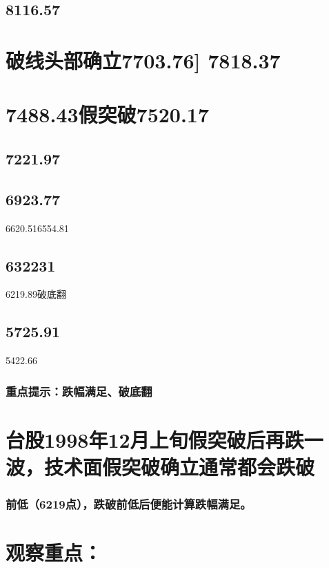 \documentclass{article}
\begin{document}
\subsection{8116.57}

\section{破线头部确立7703.76] 7818.37}

\section{7488.43假突破7520.17}

\subsection{7221.97}

\subsection{6923.77}

6620.516554.81

\subsection{632231}

6219.89破底翻

\subsection{5725.91}

5422.66

\subsubsection{重点提示：跌幅满足、破底翻}

\section{台股1998年12月上旬假突破后再跌一波，技术面假突破确立通常都会跌破}

\subsubsection{前低（6219点），跌破前低后便能计算跌幅满足。}

\section{观察重点：}
\end{document}
